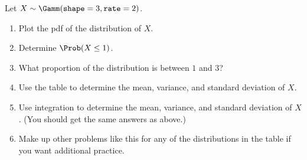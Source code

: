 \documentclass[twoside]{book}\usepackage[]{graphicx}\usepackage[]{xcolor}
\begin{document}
\begin{problem}
	Let $X \sim \Gamm(\texttt{shape}=3, \texttt{rate}=2) $.
	\begin{enumerate}
		\item
			Plot the pdf of the distribution of $X$.
		\item
			Determine $\Prob( X \le 1)$.
		\item
			What proportion of the distribution is between $1$ and $3$?
		\item
			Use the table to determine the mean, variance, and standard deviation
			of $X$.
		\item
			Use integration to determine the mean, variance, and standard deviation
			of $X$.  (You should get the same answers as above.)
		\item
			Make up other problems like this for any of the distributions
			in the table if you want additional practice.
	\end{enumerate}
\end{problem}
\end{document}
